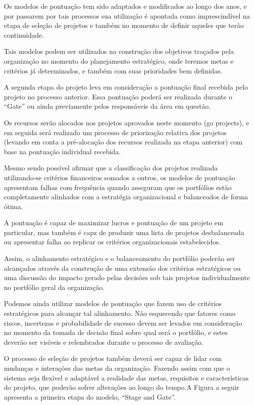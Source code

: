 \documentclass[12pt,a4paper,ruledheader,tocpage=prefix,floatnumber=continuous,pagestart=folhaderosto,font=times]{abnt}
\begin{document}
Os modelos de pontuação tem sido adaptados e modificados ao longo dos anos, e por passarem por tais processos sua utilização é apontada como imprescindível 
na etapa de seleção de projetos e também no momento de definir aqueles que terão continuidade. 

Tais modelos podem ser utilizados na construção dos objetivos traçados pela organização no momento do planejamento estratégico, onde teremos metas e 
critérios já determinados, e também com suas prioridades bem definidas.

A segunda etapa do projeto leva em consideração a pontuação final recebida pelo projeto no processo anterior. Essa pontuação poderá ser realizada durante o
``Gate'' ou ainda previamente pelos responsáveis da área em questão. 

Os recursos serão alocados nos projetos aprovados neste momento (go projects), e em seguida será realizado um processo de priorização relativa dos 
projetos (levando em conta a pré-alocação dos recursos realizada na etapa anterior) com base na pontuação individual recebida.

Mesmo sendo possível afirmar que a classificação dos projetos realizada utilizando-se critérios financeiros somados a outros, os modelos de pontuação
apresentam falhas com frequência quando asseguram que os portfólios estão completamente alinhados com a estratégia organizacional e balanceados de forma ótima.

A pontuação é capaz de maximizar lucros e pontuação de um projeto em particular, mas também é capz de produzir uma lista de projetos desbalanceada ou apresentar
falha ao replicar os critérios organizacionais estabelecidos.

Assim, o alinhamento estratégico e o balanceamento do portfólio poderão ser alcançados através da construção de uma extensão dos critérios estratégicos ou
uma discussão do impacto gerado pelas decisões sob tais projetos individualmente no portfólio geral da organização. 

Podemos ainda utilizar modelos de pontuação que fazem uso de critérios estratégicos para alcançar tal alinhamento. Não esquecendo que fatores como riscos,
incertezas e probabilidade de sucesso devem ser levados em consideração no momento da tomada de decisão final sobre qual será o portfólio, e estes 
deverão ser visíveis e relembrados durante o processo de avaliação.

O processo de seleção de projetos também deverá ser capaz de lidar com mudanças e interações das metas da organização. Fazendo assim com que o sistema seja 
flexível e adaptável a realidade das metas, requisitos e características do projeto, que poderão sofrer alterações ao longo do tempo.A Figura a seguir 
apresenta a primeira etapa do modelo, ``Stage and Gate''.
\end{document}
